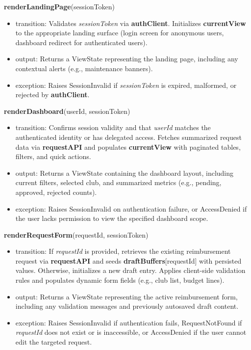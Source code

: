 \documentclass[12pt, titlepage]{article}
\begin{document}
\noindent\textbf{renderLandingPage}(sessionToken)
\begin{itemize}
  \item transition: Validates \textit{sessionToken} via \textbf{authClient}. Initializes \textbf{currentView} to the appropriate landing surface (login screen for anonymous users, dashboard redirect for authenticated users).
  \item output: Returns a ViewState representing the landing page, including any contextual alerts (e.g., maintenance banners).
  \item exception: Raises SessionInvalid if \textit{sessionToken} is expired, malformed, or rejected by \textbf{authClient}.
\end{itemize}

\noindent\textbf{renderDashboard}(userId, sessionToken)
\begin{itemize}
  \item transition: Confirms session validity and that \textit{userId} matches the authenticated identity or has delegated access. Fetches summarized request data via \textbf{requestAPI} and populates \textbf{currentView} with paginated tables, filters, and quick actions.
  \item output: Returns a ViewState containing the dashboard layout, including current filters, selected club, and summarized metrics (e.g., pending, approved, rejected counts).
  \item exception: Raises SessionInvalid on authentication failure, or AccessDenied if the user lacks permission to view the specified dashboard scope.
\end{itemize}

\noindent\textbf{renderRequestForm}(requestId, sessionToken)
\begin{itemize}
  \item transition: If \textit{requestId} is provided, retrieves the existing reimbursement request via \textbf{requestAPI} and seeds \textbf{draftBuffers}[requestId] with persisted values. Otherwise, initializes a new draft entry. Applies client-side validation rules and populates dynamic form fields (e.g., club list, budget lines).
  \item output: Returns a ViewState representing the active reimbursement form, including any validation messages and previously autosaved draft content.
  \item exception: Raises SessionInvalid if authentication fails, RequestNotFound if \textit{requestId} does not exist or is inaccessible, or AccessDenied if the user cannot edit the targeted request.
\end{itemize}
\end{document}
